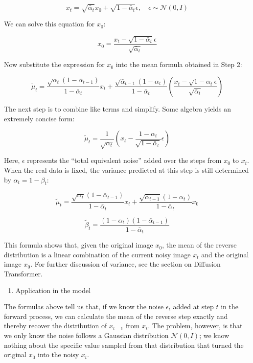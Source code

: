 \[
x_t=\sqrt{\bar{\alpha}_t}x_0+\sqrt{1-\bar{\alpha}_t}\epsilon,\quad \epsilon\sim\mathcal{N}(0,I)
\]

We can solve this equation for \(x_0\):

\[
x_0=\frac{x_t-\sqrt{1-\bar{\alpha}_t}\epsilon}{\sqrt{\bar{\alpha}_t}}
\]

Now substitute the expression for \(x_0\) into the mean formula obtained in Step 2:

\[
\tilde{\mu}_t=
\frac{\sqrt{\alpha_t}(1-\bar{\alpha}_{t-1})}{1-\bar{\alpha}_t}x_t
+\frac{\sqrt{\bar{\alpha}_{t-1}}(1-\alpha_t)}{1-\bar{\alpha}_t}
\left(\frac{x_t-\sqrt{1-\bar{\alpha}_t}\epsilon}{\sqrt{\bar{\alpha}_t}}\right)
\]

The next step is to combine like terms and simplify. Some algebra yields an extremely concise form:

\[
\tilde{\mu}_t=\frac{1}{\sqrt{\alpha_t}}
\left(x_t-\frac{1-\alpha_t}{\sqrt{1-\bar{\alpha}_t}}\epsilon\right)
\]

Here, \(\epsilon\) represents the ``total equivalent noise'' added over the steps from \(x_0\) to \(x_t\).
When the real data is fixed, the variance predicted at this step is still determined by \(\alpha_t=1-\beta_t\):

\[
\tilde{\mu}_t=
\frac{\sqrt{\alpha_t}(1-\bar{\alpha}_{t-1})}{1-\bar{\alpha}_t}x_t
+\frac{\sqrt{\bar{\alpha}_{t-1}}(1-\alpha_t)}{1-\bar{\alpha}_t}x_0
\]

\[
\tilde{\beta}_t=\frac{(1-\alpha_t)(1-\bar{\alpha}_{t-1})}{1-\bar{\alpha}_t}
\]

This formula shows that, given the original image \(x_0\), the mean of the reverse distribution is a linear combination of the current noisy image \(x_t\) and the original image \(x_0\).
For further discussion of variance, see the section on Diffusion Transformer.

\begin{enumerate}
\def\labelenumi{\arabic{enumi}.}
\setcounter{enumi}{1}
\tightlist
\item
  Application in the model
\end{enumerate}

The formulas above tell us that, if we know the noise \(\epsilon_t\) added at step \(t\) in the forward process, we can calculate the mean of the reverse step exactly and thereby recover the distribution of \(x_{t-1}\) from \(x_t\). The problem, however, is that we only know the noise follows a Gaussian distribution \(\mathcal{N}(0,I)\); we know nothing about the specific value sampled from that distribution that turned the original \(x_0\) into the noisy \(x_t\).

